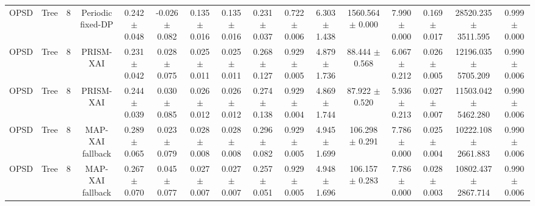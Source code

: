 \begin{tabular}{lccccccccccccccc}
OPSD & Tree & 8 & Periodic fixed-DP & 0.242 $\pm$ 0.048 & -0.026 $\pm$ 0.082 & 0.135 $\pm$ 0.016 & 0.135 $\pm$ 0.016 & 0.231 $\pm$ 0.037 & 0.722 $\pm$ 0.006 & 6.303 $\pm$ 1.438 & 1560.564 $\pm$ 0.000 & 7.990 $\pm$ 0.000 & 0.169 $\pm$ 0.017 & 28520.235 $\pm$ 3511.595 & 0.999 $\pm$ 0.000 \\
OPSD & Tree & 8 & PRISM-XAI & 0.231 $\pm$ 0.042 & 0.028 $\pm$ 0.075 & 0.025 $\pm$ 0.011 & 0.025 $\pm$ 0.011 & 0.268 $\pm$ 0.127 & 0.929 $\pm$ 0.005 & 4.879 $\pm$ 1.736 & 88.444 $\pm$ 0.568 & 6.067 $\pm$ 0.212 & 0.026 $\pm$ 0.005 & 12196.035 $\pm$ 5705.209 & 0.990 $\pm$ 0.006 \\
OPSD & Tree & 8 & PRISM-XAI & 0.244 $\pm$ 0.039 & 0.030 $\pm$ 0.085 & 0.026 $\pm$ 0.012 & 0.026 $\pm$ 0.012 & 0.274 $\pm$ 0.138 & 0.929 $\pm$ 0.004 & 4.869 $\pm$ 1.744 & 87.922 $\pm$ 0.520 & 5.936 $\pm$ 0.213 & 0.027 $\pm$ 0.007 & 11503.042 $\pm$ 5462.280 & 0.990 $\pm$ 0.006 \\
OPSD & Tree & 8 & MAP-XAI fallback & 0.289 $\pm$ 0.065 & 0.023 $\pm$ 0.079 & 0.028 $\pm$ 0.008 & 0.028 $\pm$ 0.008 & 0.296 $\pm$ 0.082 & 0.929 $\pm$ 0.005 & 4.945 $\pm$ 1.699 & 106.298 $\pm$ 0.291 & 7.786 $\pm$ 0.000 & 0.025 $\pm$ 0.004 & 10222.108 $\pm$ 2661.883 & 0.990 $\pm$ 0.006 \\
OPSD & Tree & 8 & MAP-XAI fallback & 0.267 $\pm$ 0.070 & 0.045 $\pm$ 0.077 & 0.027 $\pm$ 0.007 & 0.027 $\pm$ 0.007 & 0.257 $\pm$ 0.051 & 0.929 $\pm$ 0.005 & 4.948 $\pm$ 1.696 & 106.157 $\pm$ 0.283 & 7.786 $\pm$ 0.000 & 0.028 $\pm$ 0.003 & 10802.437 $\pm$ 2867.714 & 0.990 $\pm$ 0.006 \\
\bottomrule
\end{tabular}
